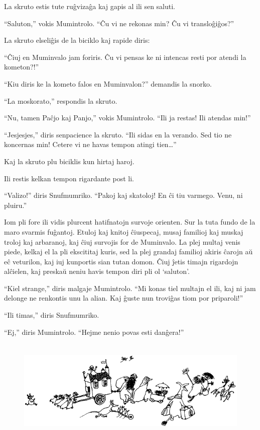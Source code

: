 La skruto estis tute ruĝvizaĝa kaj gapis al ili sen saluti.

``Saluton,'' vokis Mumintrolo. ``Ĉu vi ne rekonas min? Ĉu vi transloĝiĝos?''

La skruto elseliĝis de la biciklo kaj rapide diris:

``Ĉiuj en Muminvalo jam foriris. Ĉu vi pensas ke ni intencas resti por atendi la kometon?!''

``Kiu diris ke la kometo falos en Muminvalon?'' demandis la snorko.

``La moskorato,'' respondis la skruto.

``Nu, tamen Paĉjo kaj Panjo,'' vokis Mumintrolo. ``Ili ja restas! Ili atendas min!''

``Jesjesjes,'' diris senpacience la skruto. ``Ili sidas en la verando. Sed tio ne koncernas min! Cetere vi ne havas tempon atingi tien{\ldots}''

Kaj la skruto plu biciklis kun hirtaj haroj.

Ili restis kelkan tempon rigardante post li.

``Valizo!'' diris Snufmumriko. ``Pakoj kaj skatoloj! En ĉi tiu varmego. Venu, ni pluiru.''

Iom pli fore ili vidis plurcent hatifnatojn survoje orienten. Sur la tuta fundo de la maro svarmis fuĝantoj. Etuloj kaj knitoj ĉiuspecaj, musaj familioj kaj muskaj troloj kaj arbaranoj, kaj ĉiuj survojis for de Muminvalo. La plej multaj venis piede, kelkaj el la pli ekscititaj kuris, sed la plej grandaj familioj akiris ĉarojn aŭ eĉ veturilon, kaj iuj kunportis sian tutan domon. Ĉiuj ĵetis timajn rigardojn alĉielen, kaj preskaŭ neniu havis tempon diri pli ol `saluton'.

``Kiel strange,'' diris malgaje Mumintrolo. ``Mi konas tiel multajn el ili, kaj ni jam delonge ne renkontis unu la alian. Kaj ĝuste nun troviĝas tiom por priparoli!''

``Ili timas,'' diris Snufmumriko.

``Ej,'' diris Mumintrolo. ``Hejme nenio povas esti danĝera!''

\begin{figure}[htbp]
\centering
\includegraphics[width=417pt,height=138pt]{8-2.png}
\caption{}
\label{8-2}
\end{figure}

